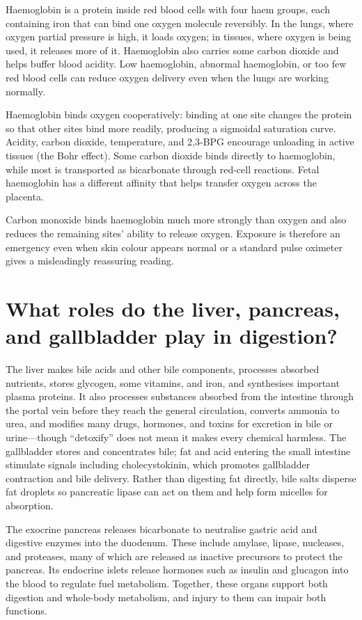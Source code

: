 \documentclass[11pt,oneside]{report}
\begin{document}
Haemoglobin is a protein inside red blood cells with four haem groups, each
containing iron that can bind one oxygen molecule reversibly. In the lungs,
where oxygen partial pressure is high, it loads oxygen; in tissues, where oxygen
is being used, it releases more of it. Haemoglobin also carries some carbon
dioxide and helps buffer blood acidity. Low haemoglobin, abnormal haemoglobin,
or too few red blood cells can reduce oxygen delivery even when the lungs are
working normally.

Haemoglobin binds oxygen cooperatively: binding at one site changes the protein
so that other sites bind more readily, producing a sigmoidal saturation curve.
Acidity, carbon dioxide, temperature, and 2,3-BPG encourage unloading in active
tissues (the Bohr effect). Some carbon dioxide binds directly to haemoglobin,
while most is transported as bicarbonate through red-cell reactions. Fetal
haemoglobin has a different affinity that helps transfer oxygen across the
placenta.

Carbon monoxide binds haemoglobin much more strongly than oxygen and also
reduces the remaining sites' ability to release oxygen. Exposure is therefore
an emergency even when skin colour appears normal or a standard pulse
oximeter gives a misleadingly reassuring reading.

\section{What roles do the liver, pancreas, and gallbladder play in digestion?}

The liver makes bile acids and other bile components, processes absorbed
nutrients, stores glycogen, some vitamins, and iron, and synthesises important
plasma proteins. It also processes substances absorbed from the intestine
through the portal vein before they reach the general circulation, converts
ammonia to urea, and modifies many drugs, hormones, and toxins for excretion in
bile or urine---though ``detoxify'' does not mean it makes every chemical
harmless. The gallbladder stores and concentrates bile; fat and acid entering
the small intestine stimulate signals including cholecystokinin, which promotes
gallbladder contraction and bile delivery. Rather than digesting fat directly,
bile salts disperse fat droplets so pancreatic lipase can act on them and help
form micelles for absorption.

The exocrine pancreas releases bicarbonate to neutralise gastric acid and
digestive enzymes into the duodenum. These include amylase, lipase, nucleases,
and proteases, many of which are released as inactive precursors to protect the
pancreas. Its endocrine islets release hormones such as insulin and glucagon
into the blood to regulate fuel metabolism. Together, these organs support
both digestion and whole-body metabolism, and injury to them can impair both
functions.
\end{document}
